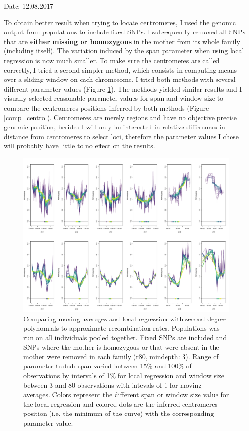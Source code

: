 \documentclass[10pt,a4paper]{report}
\begin{document}
Date: 12.08.2017

To obtain better result when trying to locate centromeres, I used the genomic output from populations to include fixed SNPs. I subsequently removed all SNPs that are \textbf{either missing or homozygous} in the mother from its whole family (including itself). The variation induced by the span parameter when using local regression is now much smaller. To make sure the centromeres are called correctly, I tried a second simpler method, which consists in computing means over a sliding window on each chromosome. I tried both methods with several different parameter values (Figure \ref{centro_fix}). The methods yielded similar results and I visually selected reasonable parameter values for span and window size to compare the centromeres positions inferred by both methods (Figure \ref{comp_centro}). Centromeres are merely regions and have no objective precise genomic position, besides I will only be interested in relative differences in distance from centromeres to select loci, therefore the parameter values I chose will probably have little to no effect on the results. 

\begin{figure}[h]
	\begin{center}
		\includegraphics[width=\textwidth]{Num_CSD_loci/centro_group_fix_d3r80_range.pdf}
		\caption{Comparing moving averages and local regression with second degree polynomials to approximate recombination rates. Populations was run on all individuals pooled together. Fixed SNPs are included and SNPs where the mother is homozygous or that were absent in the mother were removed in each family (r80, mindepth: 3). Range of parameter tested: span varied between 15\% and 100\% of observations by intervals of 1\% for local regression and window size between 3 and 80 observations with intevals of 1 for moving averages. Colors represent the different span or window size value for the local regression and colored dots are the inferred centromeres position (i.e. the minimum of the curve) with the corresponding parameter value.}
		\label{centro_fix}
	\end{center}
\end{figure}
\end{document}
